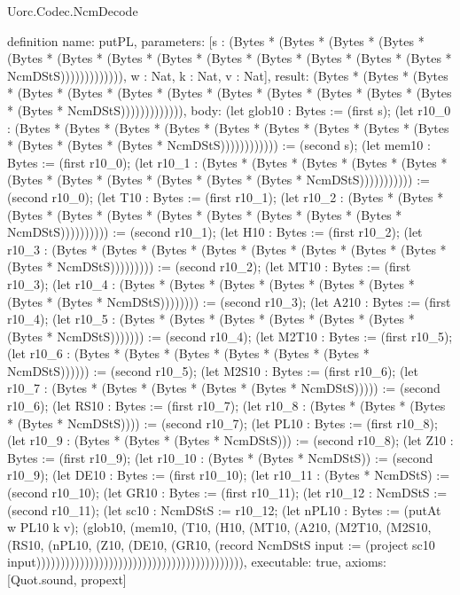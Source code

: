\begin{lexlean}{Uorc.Codec.NcmDecode}
\begin{semanticmodule}
definition{
  name: putPL,
  parameters: [s : (Bytes * (Bytes * (Bytes * (Bytes * (Bytes * (Bytes * (Bytes * (Bytes * (Bytes * (Bytes * (Bytes * (Bytes * (Bytes * NcmDStS))))))))))))), w : Nat, k : Nat, v : Nat],
  result: (Bytes * (Bytes * (Bytes * (Bytes * (Bytes * (Bytes * (Bytes * (Bytes * (Bytes * (Bytes * (Bytes * (Bytes * (Bytes * NcmDStS))))))))))))),
  body: (let glob10 : Bytes := (first s); (let r10_0 : (Bytes * (Bytes * (Bytes * (Bytes * (Bytes * (Bytes * (Bytes * (Bytes * (Bytes * (Bytes * (Bytes * (Bytes * NcmDStS)))))))))))) := (second s); (let mem10 : Bytes := (first r10_0); (let r10_1 : (Bytes * (Bytes * (Bytes * (Bytes * (Bytes * (Bytes * (Bytes * (Bytes * (Bytes * (Bytes * (Bytes * NcmDStS))))))))))) := (second r10_0); (let T10 : Bytes := (first r10_1); (let r10_2 : (Bytes * (Bytes * (Bytes * (Bytes * (Bytes * (Bytes * (Bytes * (Bytes * (Bytes * (Bytes * NcmDStS)))))))))) := (second r10_1); (let H10 : Bytes := (first r10_2); (let r10_3 : (Bytes * (Bytes * (Bytes * (Bytes * (Bytes * (Bytes * (Bytes * (Bytes * (Bytes * NcmDStS))))))))) := (second r10_2); (let MT10 : Bytes := (first r10_3); (let r10_4 : (Bytes * (Bytes * (Bytes * (Bytes * (Bytes * (Bytes * (Bytes * (Bytes * NcmDStS)))))))) := (second r10_3); (let A210 : Bytes := (first r10_4); (let r10_5 : (Bytes * (Bytes * (Bytes * (Bytes * (Bytes * (Bytes * (Bytes * NcmDStS))))))) := (second r10_4); (let M2T10 : Bytes := (first r10_5); (let r10_6 : (Bytes * (Bytes * (Bytes * (Bytes * (Bytes * (Bytes * NcmDStS)))))) := (second r10_5); (let M2S10 : Bytes := (first r10_6); (let r10_7 : (Bytes * (Bytes * (Bytes * (Bytes * (Bytes * NcmDStS))))) := (second r10_6); (let RS10 : Bytes := (first r10_7); (let r10_8 : (Bytes * (Bytes * (Bytes * (Bytes * NcmDStS)))) := (second r10_7); (let PL10 : Bytes := (first r10_8); (let r10_9 : (Bytes * (Bytes * (Bytes * NcmDStS))) := (second r10_8); (let Z10 : Bytes := (first r10_9); (let r10_10 : (Bytes * (Bytes * NcmDStS)) := (second r10_9); (let DE10 : Bytes := (first r10_10); (let r10_11 : (Bytes * NcmDStS) := (second r10_10); (let GR10 : Bytes := (first r10_11); (let r10_12 : NcmDStS := (second r10_11); (let sc10 : NcmDStS := r10_12; (let nPL10 : Bytes := (putAt w PL10 k v); (glob10, (mem10, (T10, (H10, (MT10, (A210, (M2T10, (M2S10, (RS10, (nPL10, (Z10, (DE10, (GR10, (record NcmDStS {input := (project sc10 input)})))))))))))))))))))))))))))))))))))))))))),
  executable: true,
  axioms: [Quot.sound, propext]
}


\end{semanticmodule}
\end{lexlean}

